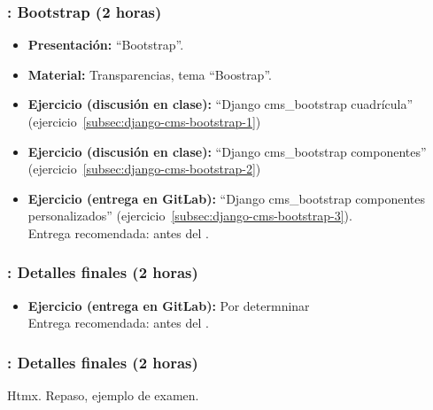 \documentclass[a4paper,12pt]{article}
\begin{document}
\subsubsection{\martesL: Bootstrap (2 horas)}
\label{cal:martesL}

\begin{itemize}
\item \textbf{Presentación:} ``Bootstrap''.
 \item \textbf{Material:} Transparencias, tema ``Boostrap''.
   \item \textbf{Ejercicio (discusión en clase):} ``Django cms\_bootstrap cuadrícula'' (ejercicio~\ref{subsec:django-cms-bootstrap-1})
   \item \textbf{Ejercicio (discusión en clase):} ``Django cms\_bootstrap componentes'' (ejercicio~\ref{subsec:django-cms-bootstrap-2})
\item \textbf{Ejercicio (entrega en GitLab):} ``Django cms\_bootstrap componentes personalizados'' (ejercicio~\ref{subsec:django-cms-bootstrap-3}). \\
  Entrega recomendada: antes del \martesM.
\end{itemize}

\subsubsection{\martesM: Detalles finales (2 horas)}
\label{cal:martesM}

\begin{itemize}
  \item \textbf{Ejercicio (entrega en GitLab):} Por determninar \\
  Entrega recomendada: antes del \martesN.
\end{itemize}


\subsubsection{\martesN: Detalles finales (2 horas)}
\label{cal:martesN}

Htmx. Repaso, ejemplo de examen.

\end{document}
